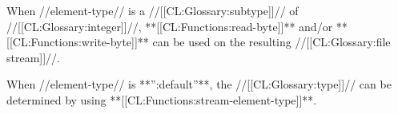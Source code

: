 When //element-type// is a //[[CL:Glossary:subtype]]// of //[[CL:Glossary:integer]]//, **[[CL:Functions:read-byte]]** and/or **[[CL:Functions:write-byte]]** can be used on the resulting //[[CL:Glossary:file stream]]//.

When //element-type// is **'':default''**, the //[[CL:Glossary:type]]// can be determined by using **[[CL:Functions:stream-element-type]]**.

       
